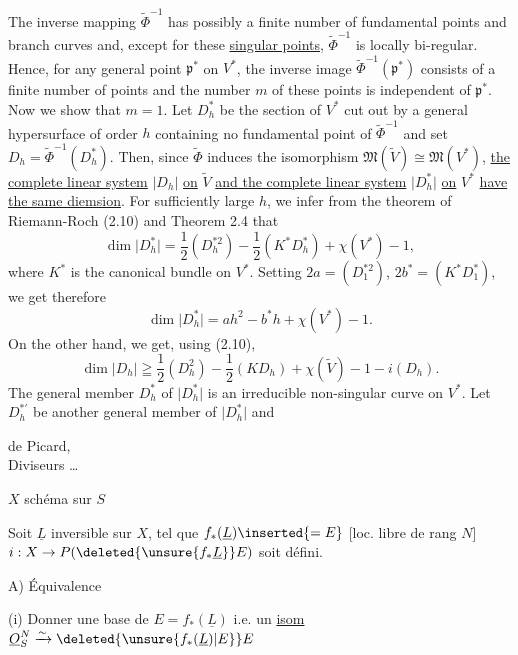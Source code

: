 The inverse mapping $\widetilde{\Phi}^{-1}$ has possibly a finite number of fundamental points and branch curves and, except for these \uline{singular points}, $\widetilde{\Phi}^{-1}$ is locally bi-regular. Hence, for any general point $\mathfrak{p}^{*}$ on $V^{*}$, the inverse image $\widetilde{\Phi}^{-1}(\mathfrak{p}^{*})$ consists of a finite number of points and the number $m$ of these points is independent of $\mathfrak{p}^{*}$. Now we show that $m=1$. Let $D_h^{*}$ be the section of $V^{*}$ cut out by a general hypersurface of order $h$ containing no fundamental point of $\widetilde{\Phi}^{-1}$ and set $D_h=\widetilde{\Phi}^{-1}(D_h^{*})$. Then, since $\widetilde{\Phi}$ induces the isomorphism $\mathfrak{M}(\widetilde{V})\cong\mathfrak{M}(V^{*})$, \uline{the complete linear system} $\lvert D_h\rvert$ \uline{on} $\widetilde{V}$ \uline{and the complete linear system} $\lvert D_h^{*}\rvert$ \uline{on} $V^{*}$ \uline{have the same diemsion}. For sufficiently large $h$, we infer from the theorem of Riemann-Roch (2.10) and Theorem 2.4 that
\[
\dim\lvert D_h^{*}\rvert=\frac{1}{2}(D_h^{*2})-\frac{1}{2}(K^{*}D_h^{*})+\chi(V^{*})-1,
\]
where $K^{*}$ is the canonical bundle on $V^{*}$. Setting $2a=(D_1^{*2})$, $2b^{*}=(K^{*}D_1^{*})$, we get therefore
\[
\dim\lvert D_h^{*}\rvert=ah^2-b^{*}h+\chi(V^{*})-1.
\]
On the other hand, we get, using (2.10),
\[
\dim\lvert D_h\rvert\geqq\frac{1}{2}(D_h^{2})-\frac{1}{2}(KD_h)+\chi(\widetilde{V})-1-i(D_h).
\]
The general member $D_h^{*}$ of $\lvert D_h^{*}\rvert$ is an irreducible non-singular curve on $V^{*}$. Let $D_h^{*\prime}$ be another general member of $\lvert D_h^{*}\rvert$ and
\begin{flushright}
 de Picard,\\
Diviseurs \ldots
\end{flushright}
$X$ schéma \uline{} sur $S$

 Soit $\underline{L}$ inversible  sur $X$, tel que $f_{*}(\underline{L})\inserted{=E}$ [loc. libre de rang $N$]  $i:X\to P(\deleted{\unsure{f_{*}\underline{L}}}E)$ soit défini.

A) Équivalence

(i) Donner une base de $E=f_{*}(\underline{L})$ i.e. un \uline{isom} $\underline{O}_{S}^{N}\xrightarrow{\sim}\deleted{\unsure{f_{*}(\underline{L})|E}}E$

